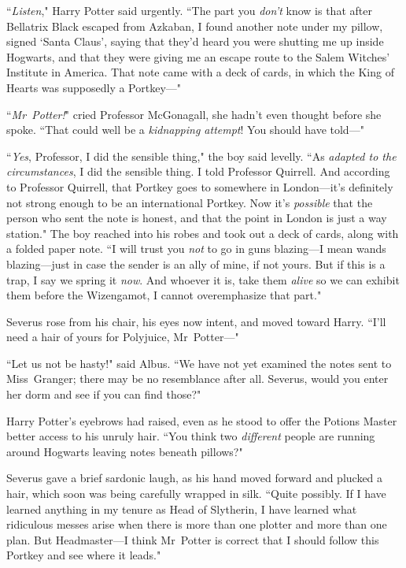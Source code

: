 ``\emph{Listen}," Harry Potter said urgently. ``The part you \emph{don't} know is that after Bellatrix Black escaped from Azkaban, I found another note under my pillow, signed `Santa Claus', saying that they'd heard you were shutting me up inside Hogwarts, and that they were giving me an escape route to the Salem Witches' Institute in America. That note came with a deck of cards, in which the King of Hearts was supposedly a Portkey—"

``\emph{Mr~Potter!}" cried Professor McGonagall, she hadn't even thought before she spoke. ``That could well be a \emph{kidnapping attempt}! You should have told—"

``\emph{Yes}, Professor, I did the sensible thing," the boy said levelly. ``As \emph{adapted to the circumstances}, I did the sensible thing. I told Professor Quirrell. And according to Professor Quirrell, that Portkey goes to somewhere in London—it's definitely not strong enough to be an international Portkey. Now it's \emph{possible} that the person who sent the note is honest, and that the point in London is just a way station." The boy reached into his robes and took out a deck of cards, along with a folded paper note. ``I will trust you \emph{not} to go in guns blazing—I mean wands blazing—just in case the sender is an ally of mine, if not yours. But if this is a trap, I say we spring it \emph{now}. And whoever it is, take them \emph{alive} so we can exhibit them before the Wizengamot, I cannot overemphasize that part."

Severus rose from his chair, his eyes now intent, and moved toward Harry. ``I'll need a hair of yours for Polyjuice, Mr~Potter—"

``Let us not be hasty!" said Albus. ``We have not yet examined the notes sent to Miss~Granger; there may be no resemblance after all. Severus, would you enter her dorm and see if you can find those?"

Harry Potter's eyebrows had raised, even as he stood to offer the Potions Master better access to his unruly hair. ``You think two \emph{different} people are running around Hogwarts leaving notes beneath pillows?"

Severus gave a brief sardonic laugh, as his hand moved forward and plucked a hair, which soon was being carefully wrapped in silk. ``Quite possibly. If I have learned anything in my tenure as Head of Slytherin, I have learned what ridiculous messes arise when there is more than one plotter and more than one plan. But Headmaster—I think Mr~Potter is correct that I should follow this Portkey and see where it leads."

